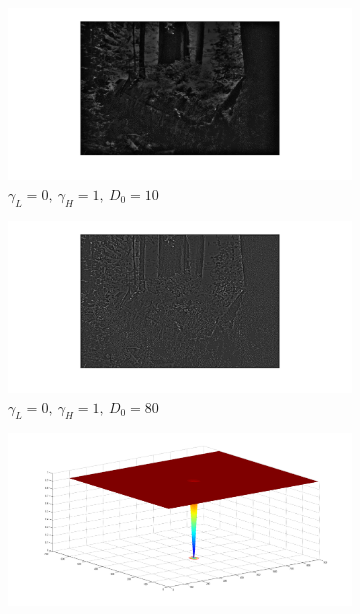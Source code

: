 \documentclass[a4paper]{article}
\begin{document}
		\begin{figure}[h!]
			\centering
			\begin{subfigure}[b]{0.7\textwidth}
				\includegraphics[width=\textwidth]{../pics/low_sigma.png}
				\caption{$\gamma_L = 0,~\gamma_H = 1,~D_0 = 10$}
				\label{fig:low_sigma}
			\end{subfigure}%
			\begin{subfigure}[b]{0.7\textwidth}
				\includegraphics[width=\textwidth]{../pics/high_sigma.png}
				\caption{$\gamma_L = 0,~\gamma_H = 1,~D_0 =80$}
				\label{fig:high_sigma}
			\end{subfigure}
			\label{fig:sigma}
			\begin{subfigure}[b]{0.6\textwidth}
				\includegraphics[width=\textwidth]{../pics/low_sigma_filter.png}

\end{subfigure}
\end{figure}
\end{document}
